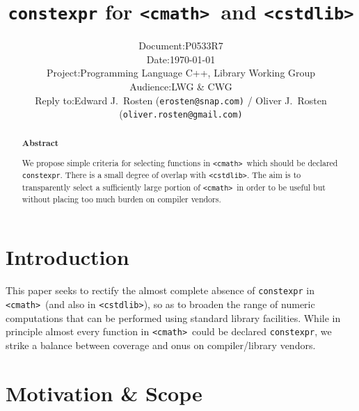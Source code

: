 \documentclass[prd,twocolumn,amsmath,amssymb,nofootinbib,eqsecnum]{revtex4-1}
\newcommand{\constexpr}{\code{constexpr}\xspace}
\newcommand{\code}[1]{{\tt #1}}
\newcommand{\header}[1]{{\tt <#1>}}
\newcommand{\cmath}{\header{cmath}}
\newcommand{\cstdlib}{\header{cstdlib}}
\begin{document}
\title{\constexpr for \cmath\ and \cstdlib}

\author{
\hspace{11.5em}
\begin{tabular}{ll}
	Document: & P0533R7
\\
	Date: & \today
\\
	Project: & Programming Language C++, Library Working Group
\\
	Audience: & LWG \& CWG
\\
	Reply to: & Edward J.\ Rosten {(\tt erosten@snap.com)}
 / Oliver J.\ Rosten {(\tt oliver.rosten@gmail.com)}
\end{tabular}
}

\begin{abstract}

\begin{center} {\bf Abstract} \end{center}
We propose simple criteria for selecting functions in \cmath\ which should be
declared \constexpr. There is a small degree of overlap with \cstdlib.
 The aim is to transparently select a sufficiently large portion of \cmath\ 
in order to be useful but without placing too much burden on compiler vendors.
	
\end{abstract}


\maketitle

\tableofcontents

\section{Introduction}

This paper seeks to rectify the almost complete absence of \constexpr in
 \cmath\ (and also in \cstdlib), so as to broaden the range of numeric computations that can be
performed using standard library facilities. While in principle almost every function
in \cmath\ could be declared \constexpr, we strike a balance between coverage and onus on compiler/library vendors.


\section{Motivation \& Scope}
\end{document}
